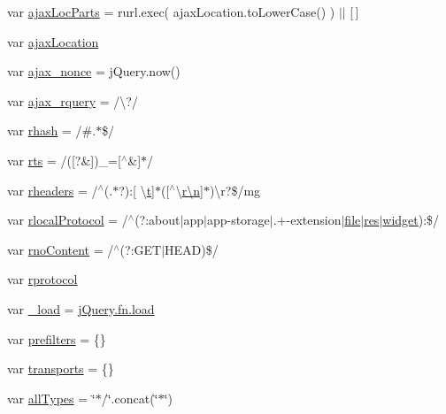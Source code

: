\begin{DoxyCompactItemize}
\item 
var \hyperlink{jquery-1_8x_8js_a4c35110da3c335cfca38505ee65a5e79}{ajax\+Loc\+Parts} = rurl.\+exec( ajax\+Location.\+to\+Lower\+Case() ) $\vert$$\vert$ \mbox{[}$\,$\mbox{]}
\item 
var \hyperlink{jquery-1_8x_8js_a1661d4e1676e7c6ffde5a3cb8d8ae246}{ajax\+Location}
\item 
var \hyperlink{jquery-1_8x_8js_aaa43e6d4c76ee8be878dd7e93fb755a4}{ajax\+\_\+nonce} = j\+Query.\+now()
\item 
var \hyperlink{jquery-1_8x_8js_a4da85c0011217bf1643139dc23999c5c}{ajax\+\_\+rquery} = /\textbackslash{}?/
\item 
var \hyperlink{jquery-1_8x_8js_a6990b6955b6bec9dd39f3814cfb56d6d}{rhash} = /\#.$\ast$\$/
\item 
var \hyperlink{jquery-1_8x_8js_a38ff30904f54277281a13514d7aea00d}{rts} = /(\mbox{[}?\&\mbox{]})\+\_\+=\mbox{[}$^\wedge$\&\mbox{]}$\ast$/
\item 
var \hyperlink{jquery-1_8x_8js_af506d11612139f03091db71089d92e8b}{rheaders} = /$^\wedge$(.$\ast$?)\+:\mbox{[} \textbackslash{}\hyperlink{jquery_8min_8js_aaccc9105df5383111407fd5b41255e23}{t}\mbox{]}$\ast$(\mbox{[}$^\wedge$\textbackslash{}\hyperlink{jquery-1_8x_8min_8js_afc984c4f6c68ce30a0af99006f5f8d27}{r\textbackslash{}n}\mbox{]}$\ast$)\textbackslash{}r?\$/mg
\item 
var \hyperlink{jquery-1_8x_8js_af4dd13c90298bbf53ce08ec707dc9e2a}{rlocal\+Protocol} = /$^\wedge$(?\+:about$\vert$app$\vert$app-\/storage$\vert$.+-\/extension$\vert$\hyperlink{classfile}{file}$\vert$\hyperlink{image__gallery_2tpl_2popup_8js_a9559c70bbf95d1f018e5799d4c4067a2}{res}$\vert$\hyperlink{classwidget}{widget})\+:\$/
\item 
var \hyperlink{jquery-1_8x_8js_a537d744d72e31ec312aa3f16ef576d3f}{rno\+Content} = /$^\wedge$(?\+:G\+ET$\vert$H\+E\+AD)\$/
\item 
var \hyperlink{jquery-1_8x_8js_a0f02b710647fcf95e74593954fb9b4cb}{rprotocol}
\item 
var \hyperlink{jquery-1_8x_8js_ab9d9919a16b6ef96017991e55a3a9e6c}{\+\_\+load} = \hyperlink{js__app_8js_a59fdbbb5ca9580c7f04d006dbf27cfe4}{j\+Query.\+fn.\+load}
\item 
var \hyperlink{jquery-1_8x_8js_a5682e57225039bc5b0c2e80654930080}{prefilters} = \{\}
\item 
var \hyperlink{jquery-1_8x_8js_ae354ef69102eb621a6b2ef6c9fc4d6a3}{transports} = \{\}
\item 
var \hyperlink{jquery-1_8x_8js_a2d6199559f6d1e840af674910a329b04}{all\+Types} = \char`\"{}$\ast$/\char`\"{}.concat(\char`\"{}$\ast$\char`\"{})
$$
\end{DoxyCompactItemize}
